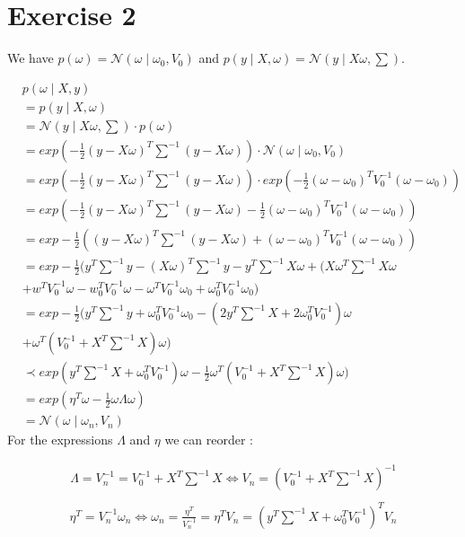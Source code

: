 \documentclass{article}
\begin{document}
\section*{Exercise 2}

We have $p(\omega) = \mathcal{N}(\omega \mid \omega_0, V_0)$ and $p(y \mid X, \omega) = \mathcal{N}(y \mid X\omega, \sum)$.

\begin{align*}
&p(\omega \mid X, y) \\
&= p(y\mid X,\omega) \\
 &= \mathcal{N}(y\mid X\omega, \sum) \cdot p(\omega) \\
 &= exp(-\frac{1}{2} (y - X\omega) ^{T} \sum \nolimits ^{-1}(y - X\omega)) \cdot \mathcal{N}(\omega \mid \omega_0, V_0) \\
 &= exp(-\frac{1}{2} (y - X\omega) ^{T} \sum \nolimits ^{-1}(y - X\omega)) \cdot exp(-\frac{1}{2}(\omega - \omega_0) ^{T} V_0 ^{-1}(\omega - \omega_0)) \\
 &= exp(-\frac{1}{2} (y - X\omega) ^{T} \sum \nolimits ^{-1}(y - X\omega) -\frac{1}{2}(\omega - \omega_0) ^{T} V_0 ^{-1}(\omega - \omega_0)) \\
  &= exp -\frac{1}{2} ((y - X\omega) ^{T} \sum \nolimits ^{-1}(y - X\omega) + (\omega - \omega_0) ^{T} V_0 ^{-1}(\omega - \omega_0)) \\
  &= exp -\frac{1}{2}(y^{T} \sum \nolimits ^{-1} y- (X\omega)^{T} \sum \nolimits ^{-1} y - y ^{T} \sum \nolimits ^{-1} X\omega + (X\omega^{T} \sum \nolimits ^{-1} X \omega \\
  &+ w^{T} V_0^{-1} \omega - w_0^{T}V_0^{-1}\omega - \omega^{T} V_0^{-1}\omega_0 + \omega_0^{T} V_0^{-1} \omega_0) \\
  &= exp -\frac{1}{2}(y^{T} \sum \nolimits^{-1} y + \omega_0^{T}V_0^{-1}\omega_0 - (2y^{T} \sum \nolimits ^{-1} X + 2 \omega_0^{T} V_0^{-1}) \omega \\
  &+ \omega^{T}(V_0^{-1} + X^{T} \sum \nolimits ^{-1} X) \omega) \\
  &\prec exp(y^{T} \sum \nolimits ^{-1} X + \omega_0^{T} V_0^{-1}) \omega - \frac{1}{2} \omega^{T}(V_0^{-1} + X^{T} \sum \nolimits ^{-1} X) \omega) \\
  &= exp(\eta^{T} \omega - \frac{1}{2} \omega \Lambda \omega) \\
  &= \mathcal{N}(\omega \mid \omega_n, V_n)
\end{align*}
For the expressions $\Lambda$ and $\eta$ we can reorder :

\begin{align*}
\Lambda = V_n^{-1} = V_0^{-1} + X^{T} \sum \nolimits ^{-1} X \Leftrightarrow V_n = (V_0^{-1} + X^{T} \sum \nolimits^{-1} X)^{-1} \\
\end{align*}
\begin{align*}
\eta^{T} = V_n^{-1} \omega_n \Leftrightarrow \omega_n = \frac{\eta^{T}}{V_n^{-1}} = \eta^{T} V_n = (y^{T} \sum \nolimits ^{-1} X + \omega_0^{T} V_0^{-1})^{T} V_n \\
\end{align*}
\end{document}
